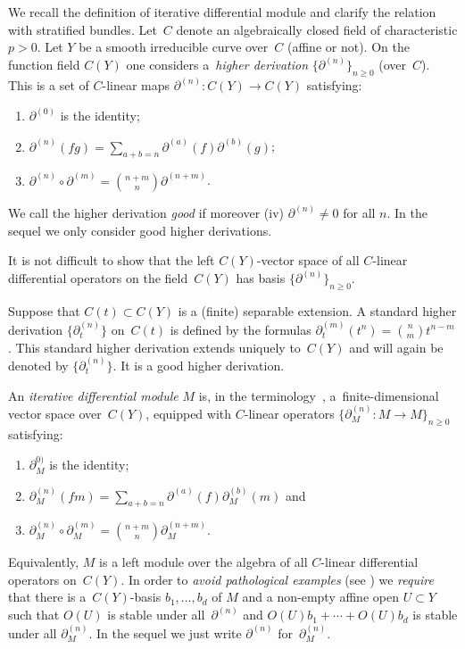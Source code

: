 \documentclass[10pt,a4paper]{amsart}
\numberwithin{equation}{section}
\begin{document}
We recall the definition of iterative differential module and clarify the relation with stratified bundles. Let~$C$ denote an algebraically closed field of characteristic $p>0$. Let $Y$ be a smooth irreducible curve over~$C$ (affine or not). On the function field $C(Y)$ one considers a~{\it higher derivation} $\big\{\partial ^{(n)}\big\}_{n\geq 0}$ (over~$C$). This is a set of $C$-linear maps $\partial^{(n)}\colon C(Y)\rightarrow C(Y)$ satisfying:
\begin{enumerate}\itemsep=0pt
\item[(i)] $\partial^{(0)}$ is the identity;
\item[(ii)] $\partial ^{(n)}(fg)=\sum\limits_{a+b=n}\partial^{(a)}(f)\partial^{(b)}(g)$;
\item[(iii)] $\partial ^{(n)}\circ \partial ^{(m)}={n+m\choose n}\partial ^{(n+m)}$.
\end{enumerate}
We call the higher derivation {\it good} if moreover (iv) $\partial^{(n)}\neq 0$ for all $n$. In the sequel we only consider good higher derivations.

It is not difficult to show that the left $C(Y)$-vector space of all $C$-linear differential operators on the field~$C(Y)$ has basis $\big\{\partial ^{(n)}\big\}_{n\geq 0}$.

\begin{Example} Suppose that $C(t)\subset C(Y)$ is a (finite) separable extension. A standard higher derivation $\big\{\partial^{(n)}_t\big\}$ on~$C(t)$ is defined by the formulas $\partial_t^{(m)}(t^n)={n\choose m }t^{n-m}$. This standard higher derivation extends uniquely to~$C(Y)$ and will again be denoted by $\big\{\partial^{(n)}_t\big\}$. It is a good higher derivation.
\end{Example}

An {\it iterative differential module} $M$ is, in the terminology~\cite{Ma-vdP1}, a~finite-dimensional vector space over~$C(Y)$, equipped with $C$-linear operators $\big\{\partial_M^{(n)}\colon M\rightarrow M\big\}_{n\geq 0}$ satisfying:
\begin{enumerate}\itemsep=0pt
\item[(a)] $\partial_M^{0)}$ is the identity;
\item[(b)] $\partial^{(n)}_M(fm)=\sum\limits _{a+b=n}\partial^{(a)}(f)\partial_M^{(b)}(m)$ and
\item[(c)] $\partial _M^{(n)}\circ \partial _M^{(m)}={n+m\choose n }\partial_M^{(n+m)}$.
\end{enumerate}

Equivalently, $M$ is a left module over the algebra of all $C$-linear differential operators on~$C(Y)$. In order to {\it avoid pathological examples} (see \cite[Sections~4.2 and~7]{Ma-vdP1}) we {\it require} that there is a~$C(Y)$-basis $b_1,\dots ,b_d$ of $M$ and a non-empty affine open $U\subset Y$ such that $O(U)$ is stable under all~$\partial^{(n)}$ and $O(U)b_1+\cdots +O(U)b_d$ is stable under all $\partial_M^{(n)}$. In the sequel we just write $\partial^{(n)}$ for~$\partial^{(n)}_M$.
\end{document}
